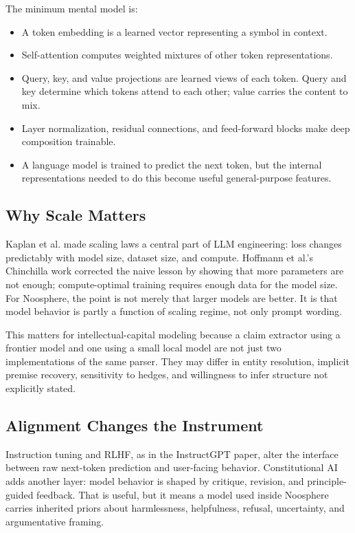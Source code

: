 \documentclass[11pt]{article}
\begin{document}
The minimum mental model is:

\begin{itemize}
\item A token embedding is a learned vector representing a symbol in context.
\item Self-attention computes weighted mixtures of other token representations.
\item Query, key, and value projections are learned views of each token. Query
and key determine which tokens attend to each other; value carries the content
to mix.
\item Layer normalization, residual connections, and feed-forward blocks make
deep composition trainable.
\item A language model is trained to predict the next token, but the internal
representations needed to do this become useful general-purpose features.
\end{itemize}

\subsection{Why Scale Matters}

Kaplan et al. made scaling laws a central part of LLM engineering: loss changes
predictably with model size, dataset size, and compute. Hoffmann et al.'s
Chinchilla work corrected the naive lesson by showing that more parameters are
not enough; compute-optimal training requires enough data for the model size.
For Noosphere, the point is not merely that larger models are better. It is that
model behavior is partly a function of scaling regime, not only prompt wording.

This matters for intellectual-capital modeling because a claim extractor using
a frontier model and one using a small local model are not just two
implementations of the same parser. They may differ in entity resolution,
implicit premise recovery, sensitivity to hedges, and willingness to infer
structure not explicitly stated.

\subsection{Alignment Changes the Instrument}

Instruction tuning and RLHF, as in the InstructGPT paper, alter the interface
between raw next-token prediction and user-facing behavior. Constitutional AI
adds another layer: model behavior is shaped by critique, revision, and
principle-guided feedback. That is useful, but it means a model used inside
Noosphere carries inherited priors about harmlessness, helpfulness, refusal,
uncertainty, and argumentative framing.
\end{document}
